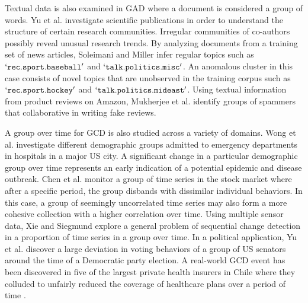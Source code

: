 Textual data is also examined in GAD where a document is considered a group of words. 
Yu et al. \cite{GLAD} investigate scientific publications in order to understand the structure of certain research communities. Irregular communities of co-authors possibly reveal unusual research trends.  By analyzing documents from a training set of news articles, Soleimani and Miller \cite{ATD} infer regular topics   such as $`\mathtt{rec.sport.baseball}'$  and $`\mathtt{ talk.politics.misc}'$. An anomalous cluster in this case consists of novel topics that are unobserved in the training corpus such as $`\mathtt{rec.sport.hockey}'$ and $`\mathtt{talk.politics.mideast}'$. Using  textual information from product reviews on Amazon, Mukherjee et al.  \cite{GroupReviewSpam} identify  groups of spammers that collaborative in writing fake reviews. 

  
  A group over time for GCD is also studied across a variety of domains.  Wong et al. \cite{wong-rule} investigate different demographic groups admitted to  emergency departments in hospitals in a major US city.   A significant change in a particular demographic group over time represents an early indication of a potential epidemic and disease outbreak. 
  Chen et al. \cite{GLETS} monitor a group of  time series  in the stock market where after a specific period, the group disbands with dissimilar individual behaviors.     In this case, a group of seemingly uncorrelated time series may also form a more cohesive collection with a higher correlation over time.  Using multiple sensor data, Xie and Siegmund  \cite{xie2013} explore a general problem of sequential change detection in a proportion of time series in a group over time.   In a political application, Yu et al. \cite{GLAD} discover  a large deviation in voting behaviors of a group of US senators around the time of a Democratic party  election.  
  A real-world GCD event has been discovered in five of the largest private health insurers in Chile where they colluded to unfairly reduced  the coverage of healthcare plans over a period of time \cite{Chile}.  


